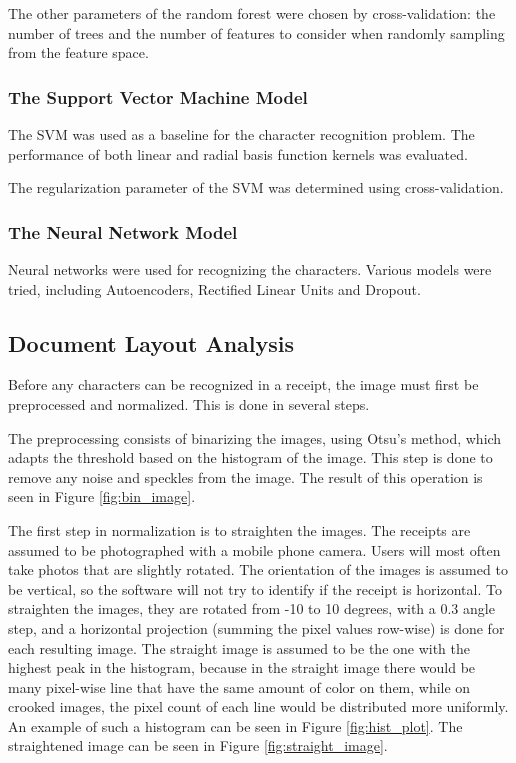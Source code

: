 The other parameters of the random forest were chosen by cross-validation: the number of trees and the number of features to consider when randomly sampling from the feature space. 

\subsubsection{The Support Vector Machine Model}
The SVM was used as a baseline for the character recognition problem. The performance of both linear and radial basis function kernels was evaluated. 

The regularization parameter of the SVM was determined using cross-validation. 

\subsubsection{The Neural Network Model}
Neural networks were used for recognizing the characters. Various models were tried, including Autoencoders, Rectified Linear Units and Dropout. 


\subsection{Document Layout Analysis}
Before any characters can be recognized in a receipt, the image must first be preprocessed and normalized. This is done in several steps. 

The preprocessing consists of binarizing the images, using Otsu's method\cite{otsu1975threshold}, which adapts the threshold based on the histogram of the image. This step is done to remove any noise and speckles from the image. The result of this operation is seen in Figure \ref{fig:bin_image}.

The first step in normalization is to straighten the images. The receipts are assumed to be photographed with a mobile phone camera. Users will most often take photos that are slightly rotated. The orientation of the images is assumed to be vertical, so the software will not try to identify if the receipt is horizontal. To straighten the images, they are rotated from -10 to 10 degrees, with a 0.3 angle step, and a horizontal projection (summing the pixel values row-wise) is done for each resulting image. The straight image is assumed to be the one with the highest peak in the histogram, because in the straight image there would be many pixel-wise line that have the same amount of color on them, while on crooked images, the pixel count of each line would be distributed more uniformly. An example of such a histogram can be seen in Figure \ref{fig:hist_plot}. The straightened image can be seen in Figure \ref{fig:straight_image}.

